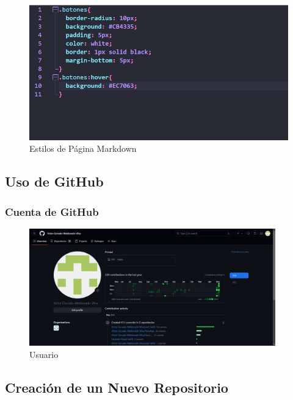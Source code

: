 \documentclass{article}
\begin{document}
\begin{itemize}
		\begin{figure}[H]
			\centering
			\includegraphics[width=1\textwidth,keepaspectratio]{img/css2.png}
			\caption{Estilos de Página Markdown}
		\end{figure}
	\end{itemize}

    \subsection{Uso de GitHub}
	\subsubsection{Cuenta de GitHub}
	\begin{figure}[H]
		\centering
		\includegraphics[width=0.95\textwidth,keepaspectratio]{img/usuario.png}
		\caption{Usuario}
	\end{figure}
	\subsection{Creación de un Nuevo Repositorio}
\end{document}
